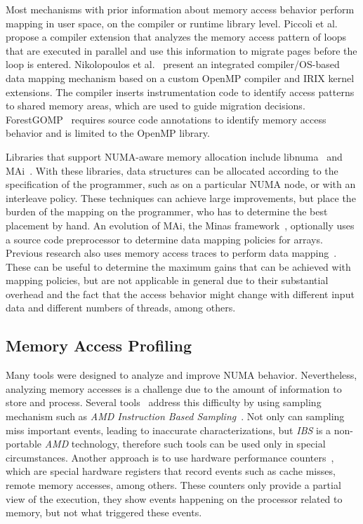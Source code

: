 Most mechanisms with prior information about memory access behavior perform mapping in user space, on the compiler or runtime library level.
Piccoli et al.~\cite{Piccoli2014} propose a compiler extension that analyzes the memory access pattern of loops that are executed in parallel and use this information to migrate pages before the loop is entered.
Nikolopoulos et al.~\cite{Nikolopoulos2000a,Nikolopoulos2000} present an integrated compiler/OS-based data mapping mechanism based on a custom OpenMP compiler and IRIX kernel extensions. The compiler inserts instrumentation code to identify access patterns to shared memory areas, which are used to guide migration decisions.
ForestGOMP~\cite{Broquedis2010a} requires source code annotations to identify memory access behavior and is limited to the OpenMP library.

Libraries that support NUMA-aware memory allocation include libnuma~\cite{Kleen2004} and MAi~\cite{Ribeiro2009}. With these libraries, data structures can be allocated according to the specification of the programmer, such as on a particular NUMA node, or with an interleave policy. These techniques can achieve large improvements, but place the burden of the mapping on the programmer, who has to determine the best placement by hand. An evolution of MAi, the Minas framework~\cite{Ribeiro2010}, optionally uses a source code preprocessor to determine data mapping policies for arrays. Previous research also uses memory access traces to perform data mapping~\cite{Diener2015,Marathe2010,Bolosky1992}. These can be useful to determine the maximum gains that can be achieved with mapping policies, but are not applicable in general due to their substantial overhead and the fact that the access behavior might change with different input data and different numbers of threads, among others.


\subsection{Memory Access Profiling}
\label{sec:soa-profiling}

Many tools were designed to analyze and improve NUMA behavior. Nevertheless, analyzing
memory accesses is a challenge due to the amount of information to store and process.
Several tools~\cite{Lachaize12MemProf,McCurdy2010}  address this difficulty by
using sampling mechanism such as \emph{AMD  Instruction Based
Sampling}~\cite{Drongowski07Instructionbase}. Not only can sampling miss important events, leading to inaccurate characterizations, but \emph{IBS} is a non-portable \emph{AMD}
technology, therefore such tools can be used only in special circumstances. Another approach is to
use hardware performance counters~\cite{Majo13(Mis)understanding,
Jiang14Understanding,Bosch00Rivet,Weyers14Visualization,Tao01Visualizing},
which are special hardware registers that record events such as cache
misses, remote memory accesses, among others. These counters only provide a partial view
of the execution, they show events happening on the processor related to
memory, but not what triggered these events.

